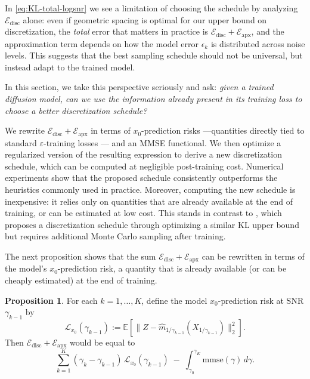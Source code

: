 \documentclass[11pt]{article}
\theoremstyle{definition}
\newtheorem{proposition}{Proposition}
\newcommand{\E}{\mathbb{E}}
\numberwithin{equation}{section}
\begin{document}

In \eqref{eq:KL-total-logsnr} we see a limitation of choosing the schedule by analyzing
$\mathcal E_{\mathrm{disc}}$ alone: even if geometric spacing is optimal for our upper bound on discretization, the
\emph{total} error that matters in practice is $\mathcal E_{\mathrm{disc}}+\mathcal E_{\mathrm{apx}}$, and the
approximation term depends on how the model error $\epsilon_k$ is distributed across noise levels. This suggests
that the best sampling schedule should not be universal, but instead adapt to the trained model.

In this section, we take this perspective seriously and ask: \emph{given a trained diffusion model, can we use
the information already present in its training loss to choose a better discretization schedule?}

We rewrite $\mathcal E_{\mathrm{disc}}+\mathcal E_{\mathrm{apx}}$ in terms of $x_0$-prediction risks ---quantities directly tied to standard $\varepsilon$-training losses --- and an MMSE functional. We then optimize a regularized version of the resulting expression to derive a new discretization schedule, which can be computed at negligible post-training cost. Numerical experiments show that the proposed schedule consistently outperforms the heuristics commonly used in practice. Moreover, computing the new schedule is inexpensive: it relies only on quantities that are already available at the end of training, or can be estimated at low cost. This stands in contrast to \cite{sabour2024align}, which proposes a discretization schedule through optimizing a similar KL upper bound but requires additional Monte Carlo sampling after training.

The next proposition
shows that the sum $\mathcal E_{\mathrm{disc}}+\mathcal E_{\mathrm{apx}}$ can be rewritten in terms of the model's $x_0$-prediction risk, a quantity that is already
available (or can be cheaply estimated) at the end of training.

\begin{proposition}
\label{prop:disc+approx}
For each $k=1,\dots,K$, define the model $x_0$-prediction risk at SNR
$\gamma_{k-1}$ by
\[
\mathcal L_{x_0}(\gamma_{k-1})
:=\E\!\left[\big\|Z-\hat m_{1/\gamma_{k-1}}(X_{1/\gamma_{k-1}})\big\|_2^2\right].
\]
Then $\mathcal E_{\mathrm{disc}}+\mathcal E_{\mathrm{apx}}$ would be equal to 
\begingroup
\small
\begin{equation}
\label{eq:disc+approx}
\sum_{k=1}^K(\gamma_k-\gamma_{k-1})\,\mathcal L_{x_0}(\gamma_{k-1})
\;-\;
\int_{\gamma_0}^{\gamma_K}\mathrm{mmse}(\gamma)\,d\gamma.
\end{equation}
\endgroup
\end{proposition}
\end{document}
